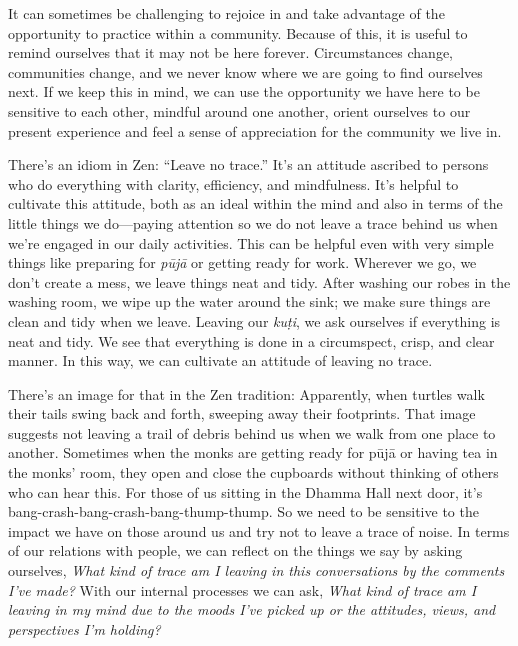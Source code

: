 It can sometimes be challenging to rejoice in and take advantage of the 
opportunity to practice within a community. Because of this, it is 
useful to remind ourselves that it may not be here forever. 
Circumstances change, communities change, and we never know where we 
are going to find ourselves next. If we keep this in mind, we can use 
the opportunity we have here to be sensitive to each other, mindful 
around one another, orient ourselves to our present experience and feel 
a sense of appreciation for the community we live in.


There's an idiom in Zen: ``Leave no trace.'' It's an attitude ascribed 
to persons who do everything with clarity, efficiency, and mindfulness. 
It's helpful to cultivate this attitude, both as an ideal within the 
mind and also in terms of the little things we do---paying attention so 
we do not leave a trace behind us when we're engaged in our daily 
activities. This can be helpful even with very simple things like 
preparing for \emph{pūjā} or getting ready for work. Wherever we go, 
we don't create a mess, we leave things neat and tidy. After washing 
our robes in the washing room, we wipe up the water around the sink; we 
make sure things are clean and tidy when we leave. Leaving our 
\emph{kuṭi}, we ask ourselves if everything is neat and tidy. We see 
that everything is done in a circumspect, crisp, and clear manner. In 
this way, we can cultivate an attitude of leaving no trace.

There's an image for that in the Zen tradition: Apparently, when 
turtles walk their tails swing back and forth, sweeping away their 
footprints. That image suggests not leaving a trail of debris behind us 
when we walk from one place to another. Sometimes when the monks are 
getting ready for pūjā or having tea in the monks' room, they open 
and close the cupboards without thinking of others who can hear this. 
For those of us sitting in the Dhamma Hall next door, it's 
bang-crash-bang-crash-bang-thump-thump. So we need to be sensitive to 
the impact we have on those around us and try not to leave a trace of 
noise. In terms of our relations with people, we can reflect on the 
things we say by asking ourselves, \emph{What kind of trace am I 
leaving in this conversations by the comments I've made?} With our 
internal processes we can ask, \emph{What kind of trace am I leaving in 
my mind due to the moods I've picked up or the attitudes, views, and 
perspectives I'm holding?}

